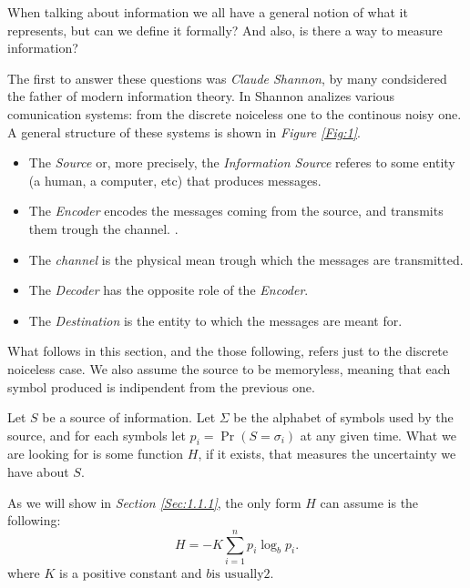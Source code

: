 \documentclass{subfiles}
\begin{document}
    When talking about information we all have a general notion of what it represents,
        but can we define it formally? And also, is there a way to measure information?

    The first to answer these questions was \emph{Claude Shannon}, 
        by many condsidered the father of modern information theory.
    In \cite{ShannonEntropy} Shannon analizes various comunication systems:
        from the discrete noiceless one to the continous noisy one.
    A general structure of these systems is shown in \emph{Figure \ref{Fig:1}}.
    

    \begin{itemize}
        \item The \emph{Source} or, more precisely, 
            the \emph{Information Source} referes to some entity
            (a human, a computer, etc) that produces messages.

        \item The \emph{Encoder} encodes the messages coming from the source,
            and transmits them trough the channel.
.
        \item The \emph{channel} is the physical mean trough which the messages
            are transmitted.

        \item The \emph{Decoder} has the opposite role of the \emph{Encoder}.
        \item The \emph{Destination} is the entity to which the messages are meant for.
    \end{itemize}

    \begin{remark*}
        What follows in this section, and the those following,
        refers just to the discrete noiceless case. 
        We also assume the source to be memoryless, 
        meaning that each symbol produced is indipendent from the previous one.
    \end{remark*}

    Let \(S\) be a source of information. 
    Let \(\Sigma\) be the alphabet of symbols used by the source,
    and for each symbols let \(p_{i} = \Pr(S = \sigma_{i})\) at any given time.
    What we are looking for is some function \(H\), if it exists,
    that measures the uncertainty we have about \(S\).

    As we will show in \emph{Section \ref{Sec:1.1.1}}, 
        the only form \(H\) can assume is the following:
    \begin{equation}\label{Eq:1}
        H = -K \sum_{i = 1}^{n}{p_{i} \log_{b} p_{i}}.
    \end{equation}
    where \(K\) is a positive constant and \(b \text{is usually} 2\).
\end{document}

